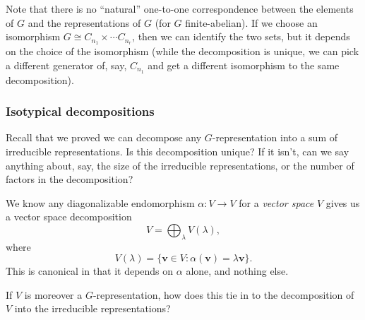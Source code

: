 \documentclass[a4paper]{article}
\begin{document}
Note that there is no ``natural'' one-to-one correspondence between the elements of $G$ and the representations of $G$ (for $G$ finite-abelian). If we choose an isomorphism $G \cong C_{n_1} \times \cdots C_{n_r}$, then we can identify the two sets, but it depends on the choice of the isomorphism (while the decomposition is unique, we can pick a different generator of, say, $C_{n_1}$ and get a different isomorphism to the same decomposition).

\subsubsection*{Isotypical decompositions}
Recall that we proved we can decompose any $G$-representation into a sum of irreducible representations. Is this decomposition unique? If it isn't, can we say anything about, say, the size of the irreducible representations, or the number of factors in the decomposition?

We know any diagonalizable endomorphism $\alpha: V \to V$ for a \emph{vector space} $V$ gives us a vector space decomposition
\[
  V = \bigoplus_{\lambda} V(\lambda),
\]
where
\[
  V(\lambda) = \{\mathbf{v} \in V: \alpha(\mathbf{v}) = \lambda \mathbf{v}\}.
\]
This is canonical in that it depends on $\alpha$ alone, and nothing else.

If $V$ is moreover a $G$-representation, how does this tie in to the decomposition of $V$ into the irreducible representations?
\end{document}

